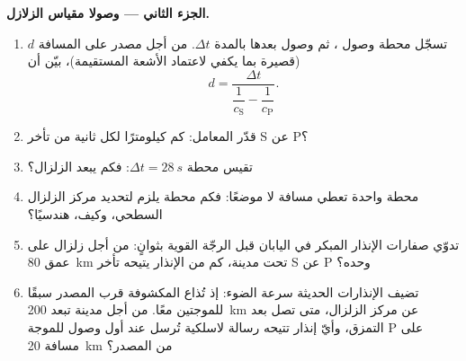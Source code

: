 \begin{problem}
\medskip\noindent\textbf{الجزء الثاني --- وصولا مقياس الزلازل.}
\begin{enumerate}[resume]
  \item تسجّل محطة وصول ، ثم وصول  بعدها
        بالمدة $\Delta t$. من أجل مصدر على المسافة $d$ (قصيرة بما
        يكفي لاعتماد الأشعة المستقيمة)، بيّن أن
        \[
        d = \frac{\Delta t}{\dfrac{1}{c_{\text{S}}} -
        \dfrac{1}{c_{\text{P}}}} .
        \]
  \item قدّر المعامل: كم كيلومترًا لكل ثانية من تأخر
        S عن P؟
  \item تقيس محطة $\Delta t = \qty{28}{s}$: فكم يبعد
        الزلزال؟
  \item محطة واحدة تعطي مسافة لا موضعًا: فكم محطة يلزم
        لتحديد مركز الزلزال السطحي، وكيف، هندسيًا؟
  \item تدوّي صفارات الإنذار المبكر في اليابان قبل الرجّة
        القوية بثوانٍ: من أجل زلزال على عمق \qty{80}{km} تحت
        مدينة، كم من الإنذار يتيحه تأخر S عن P وحده؟
  \item تضيف الإنذارات الحديثة سرعة الضوء: إذ تُذاع 
        المكشوفة قرب المصدر سبقًا للموجتين معًا. من أجل مدينة
        تبعد \qty{200}{km} عن مركز الزلزال، متى تصل  بعد
        التمزق، وأيّ إنذار تتيحه رسالة لاسلكية تُرسل عند أول
        وصول للموجة P على مسافة \qty{20}{km} من المصدر؟
\end{enumerate}


\end{problem}
